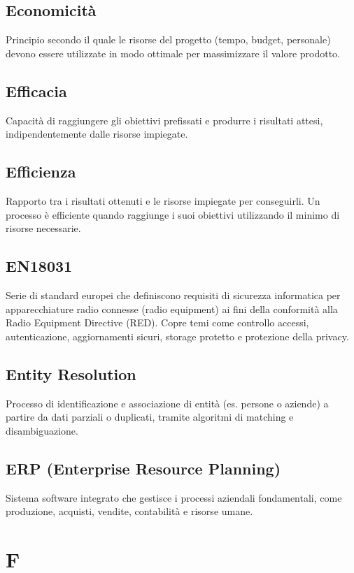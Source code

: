 \documentclass[a4paper,11pt]{article}
\begin{document}
\subsection{Economicità}
Principio secondo il quale le risorse del progetto (tempo, budget, personale) devono essere utilizzate in modo ottimale per massimizzare il valore prodotto.

\subsection{Efficacia}
Capacità di raggiungere gli obiettivi prefissati e produrre i risultati attesi, indipendentemente dalle risorse impiegate.

\subsection{Efficienza}
Rapporto tra i risultati ottenuti e le risorse impiegate per conseguirli. Un processo è efficiente quando raggiunge i suoi obiettivi utilizzando il minimo di risorse necessarie.

\subsection{EN18031}
Serie di standard europei che definiscono requisiti di sicurezza informatica per apparecchiature radio connesse (radio equipment) ai fini della conformità alla Radio Equipment Directive (RED). Copre temi come controllo accessi, autenticazione, aggiornamenti sicuri, storage protetto e protezione della privacy.

\subsection{Entity Resolution}
Processo di identificazione e associazione di entità (es. persone o aziende) a partire da dati parziali o duplicati, tramite algoritmi di matching e disambiguazione.

\subsection{ERP (Enterprise Resource Planning)}
Sistema software integrato che gestisce i processi aziendali fondamentali, come produzione, acquisti, vendite, contabilità e risorse umane.

\newpage
\section{F}
\end{document}
